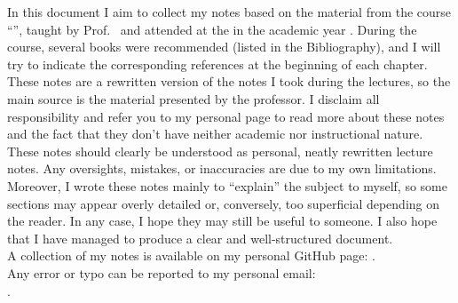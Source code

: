 In this document I aim to collect my notes based on the material from the course “\textbf{\course}”, taught by Prof. \professor\ and attended at the \textit{\university} in the academic year \academicyear. During the course, several books were recommended (listed in the Bibliography), and I will try to indicate the corresponding references at the beginning of each chapter. \\

These notes are a rewritten version of the notes I took during the lectures, so the main source is the material presented by the professor. I disclaim all responsibility and refer you to my personal page to read more about these notes and the fact that they don't have neither academic nor instructional nature. \\

These notes should clearly be understood as personal, neatly rewritten lecture notes. Any oversights, mistakes, or inaccuracies are due to my own limitations. Moreover, I wrote these notes mainly to “explain” the subject to myself, so some sections may appear overly detailed or, conversely, too superficial depending on the reader. In any case, I hope they may still be useful to someone. I also hope that I have managed to produce a clear and well-structured document. \\

A collection of my notes is available on my personal GitHub page: \personalpage. \\

Any error or typo can be reported to my personal email:\\
\mail{\mymail}.

\vfill
\begin{center}
\end{center}
